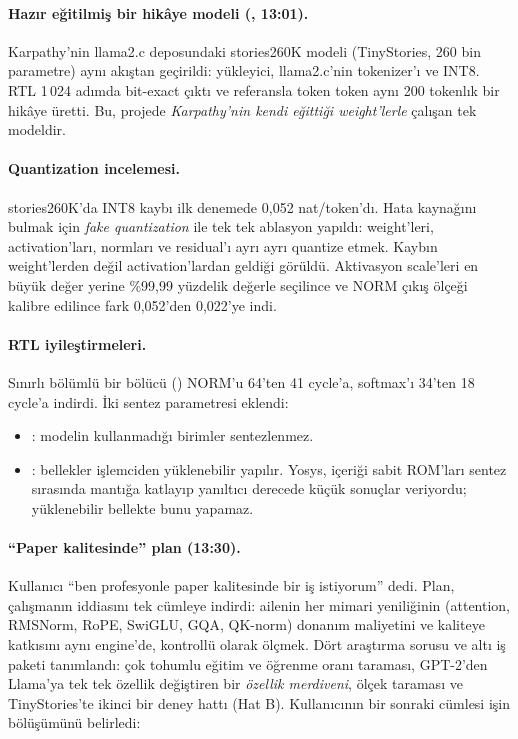 \paragraph{Hazır eğitilmiş bir hikâye modeli (, 13:01).} Karpathy'nin llama2.c deposundaki stories260K modeli (TinyStories, 260 bin parametre) aynı akıştan geçirildi:  yükleyici, llama2.c'nin  tokenizer'ı ve INT8. RTL 1\,024 adımda bit-exact çıktı ve referansla token token aynı 200 tokenlık bir hikâye üretti. Bu, projede \emph{Karpathy'nin kendi eğittiği weight'lerle} çalışan tek modeldir.

\paragraph{Quantization incelemesi.} stories260K'da INT8 kaybı ilk denemede 0,052 nat/token'dı. Hata kaynağını bulmak için \emph{fake quantization} ile tek tek ablasyon yapıldı: weight'leri, activation'ları, normları ve residual'ı ayrı ayrı quantize etmek. Kaybın weight'lerden değil activation'lardan geldiği görüldü. Aktivasyon scale'leri en büyük değer yerine \%99,99 yüzdelik değerle seçilince ve NORM çıkış ölçeği kalibre edilince fark 0,052'den 0,022'ye indi.

\paragraph{RTL iyileştirmeleri.} Sınırlı bölümlü bir bölücü () NORM'u 64'ten 41 cycle'a, softmax'ı 34'ten 18 cycle'a indirdi. İki sentez parametresi eklendi:
\begin{itemize}
  \item {}: modelin kullanmadığı birimler sentezlenmez.
  \item {}: bellekler işlemciden yüklenebilir yapılır. Yosys, içeriği sabit ROM'ları sentez sırasında mantığa katlayıp yanıltıcı derecede küçük sonuçlar veriyordu; yüklenebilir bellekte bunu yapamaz.
\end{itemize}

\paragraph{“Paper kalitesinde” plan (13:30).} Kullanıcı “ben profesyonle paper kalitesinde bir iş istiyorum” dedi. Plan, çalışmanın iddiasını tek cümleye indirdi: ailenin her mimari yeniliğinin (attention, RMSNorm, RoPE, SwiGLU, GQA, QK-norm) donanım maliyetini ve kaliteye katkısını aynı engine'de, kontrollü olarak ölçmek. Dört araştırma sorusu ve altı iş paketi tanımlandı: çok tohumlu eğitim ve öğrenme oranı taraması, GPT-2'den Llama'ya tek tek özellik değiştiren bir \emph{özellik merdiveni}, ölçek taraması ve TinyStories'te ikinci bir deney hattı (Hat B). Kullanıcının bir sonraki cümlesi işin bölüşümünü belirledi:


